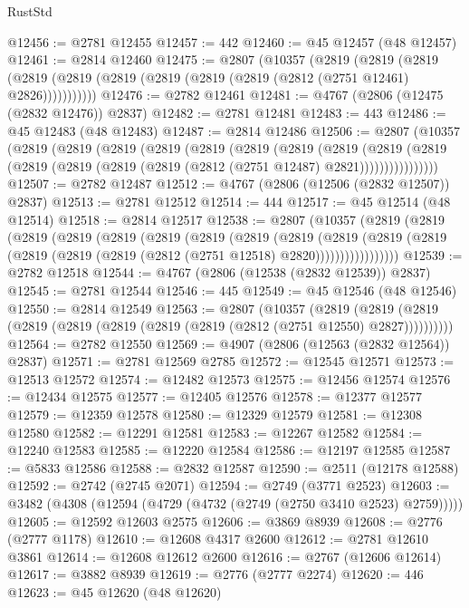\begin{lexlean}{RustStd}
\begin{coremodule}
@12456 := @2781 @12455
@12457 := 442
@12460 := @45 @12457 (@48 @12457)
@12461 := @2814 @12460
@12475 := @2807
    (@10357
      (@2819
        (@2819
          (@2819 (@2819 (@2819 (@2819 (@2819 (@2819 (@2819 (@2812 (@2751 @12461) @2826)))))))))))
@12476 := @2782 @12461
@12481 := @4767 (@2806 (@12475 (@2832 @12476)) @2837)
@12482 := @2781 @12481
@12483 := 443
@12486 := @45 @12483 (@48 @12483)
@12487 := @2814 @12486
@12506 := @2807
    (@10357
      (@2819
        (@2819
          (@2819
            (@2819
              (@2819
                (@2819
                  (@2819
                    (@2819
                      (@2819
                        (@2819
                          (@2819 (@2819 (@2819 (@2819 (@2812 (@2751 @12487) @2821))))))))))))))))
@12507 := @2782 @12487
@12512 := @4767 (@2806 (@12506 (@2832 @12507)) @2837)
@12513 := @2781 @12512
@12514 := 444
@12517 := @45 @12514 (@48 @12514)
@12518 := @2814 @12517
@12538 := @2807
    (@10357
      (@2819
        (@2819
          (@2819
            (@2819
              (@2819
                (@2819
                  (@2819
                    (@2819
                      (@2819
                        (@2819
                          (@2819
                            (@2819 (@2819 (@2819 (@2819 (@2812 (@2751 @12518) @2820)))))))))))))))))
@12539 := @2782 @12518
@12544 := @4767 (@2806 (@12538 (@2832 @12539)) @2837)
@12545 := @2781 @12544
@12546 := 445
@12549 := @45 @12546 (@48 @12546)
@12550 := @2814 @12549
@12563 := @2807
    (@10357
      (@2819 (@2819 (@2819 (@2819 (@2819 (@2819 (@2819 (@2819 (@2812 (@2751 @12550) @2827))))))))))
@12564 := @2782 @12550
@12569 := @4907 (@2806 (@12563 (@2832 @12564)) @2837)
@12571 := @2781 @12569 @2785
@12572 := @12545 @12571
@12573 := @12513 @12572
@12574 := @12482 @12573
@12575 := @12456 @12574
@12576 := @12434 @12575
@12577 := @12405 @12576
@12578 := @12377 @12577
@12579 := @12359 @12578
@12580 := @12329 @12579
@12581 := @12308 @12580
@12582 := @12291 @12581
@12583 := @12267 @12582
@12584 := @12240 @12583
@12585 := @12220 @12584
@12586 := @12197 @12585
@12587 := @5833 @12586
@12588 := @2832 @12587
@12590 := @2511 (@12178 @12588)
@12592 := @2742 (@2745 @2071)
@12594 := @2749 (@3771 @2523)
@12603 := @3482 (@4308 (@12594 (@4729 (@4732 (@2749 (@2750 @3410 @2523) @2759)))))
@12605 := @12592 @12603 @2575
@12606 := @3869 @8939
@12608 := @2776 (@2777 @1178)
@12610 := @12608 @4317 @2600
@12612 := @2781 @12610 @3861
@12614 := @12608 @12612 @2600
@12616 := @2767 (@12606 @12614)
@12617 := @3882 @8939
@12619 := @2776 (@2777 @2274)
@12620 := 446
@12623 := @45 @12620 (@48 @12620)

\end{coremodule}
\end{lexlean}
